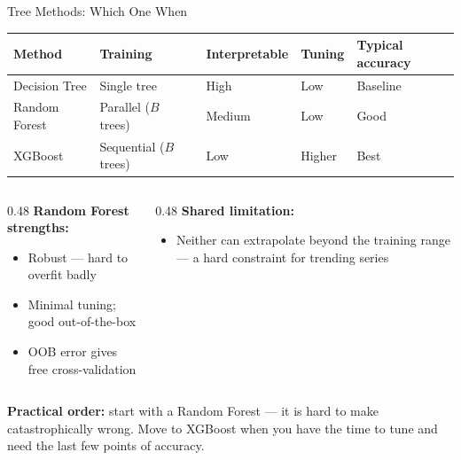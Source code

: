 \documentclass[aspectratio=169, 11pt]{beamer}
\begin{document}

\begin{frame}{Tree Methods: Which One When}
  \begin{center}
    {\small
    \begin{tabular}{lllll}
      \toprule
      \textbf{Method} & \textbf{Training} & \textbf{Interpretable} & \textbf{Tuning} & \textbf{Typical accuracy} \\
      \midrule
      Decision Tree & Single tree & High & Low & Baseline \\
      Random Forest & Parallel ($B$ trees) & Medium & Low & Good \\
      XGBoost & Sequential ($B$ trees) & Low & Higher & Best \\
      \bottomrule
    \end{tabular}
    }
  \end{center}
  \begin{columns}[T]
    \begin{column}{0.48\textwidth}
      \textbf{Random Forest strengths:}
      {
      \begin{itemize}\small\itemsep0pt
        \item Robust --- hard to overfit badly
        \item Minimal tuning; good out-of-the-box
        \item OOB error gives free cross-validation
      \end{itemize}}
    \end{column}
    \begin{column}{0.48\textwidth}
      \textbf{Shared limitation:}
      {
      \begin{itemize}\small\itemsep0pt
        \item Neither can extrapolate beyond the training range ---
              a hard constraint for trending series
      \end{itemize}}
    \end{column}
  \end{columns}
  \begin{keybox}
    \small \textbf{Practical order:} start with a Random Forest --- it is hard to make
    catastrophically wrong. Move to XGBoost when you have the time to tune and
    need the last few points of accuracy.
  \end{keybox}
\end{frame}
\end{document}

